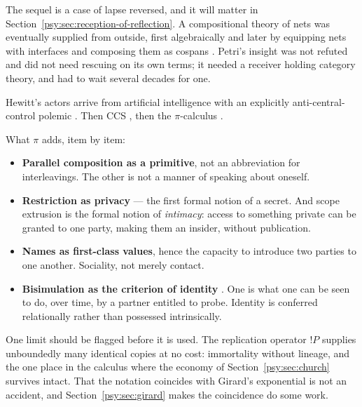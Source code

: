 The sequel is a case of lapse reversed, and it will matter in
Section~\ref{psy:sec:reception-of-reflection}.
A compositional theory of nets was eventually supplied from outside,
first algebraically \cite{meseguer1990} and later by equipping nets
with interfaces and composing them as cospans \cite{baez2020}.
Petri's insight was not refuted and did not need rescuing on its own
terms; it needed a receiver holding category theory, and had to wait
several decades for one.

Hewitt's actors arrive from artificial intelligence with an
explicitly anti-central-control polemic \cite{hewitt1973}.
Then CCS \cite{milner1980}, then the $\pi$-calculus
\cite{milner1992}.

What $\pi$ adds, item by item:

\begin{itemize}[leftmargin=1.4em,itemsep=0.15em]
\item \textbf{Parallel composition as a primitive}, not an
abbreviation for interleavings.
The other is not a manner of speaking about oneself.
\item \textbf{Restriction as privacy} --- the first formal notion of
a secret.
And scope extrusion is the formal notion of \emph{intimacy}: access
to something private can be granted to one party, making them an
insider, without publication.
\item \textbf{Names as first-class values}, hence the capacity to
introduce two parties to one another.
Sociality, not merely contact.
\item \textbf{Bisimulation as the criterion of identity}
\cite{park1981}.
One is what one can be seen to do, over time, by a partner entitled
to probe.
Identity is conferred relationally rather than possessed
intrinsically.
\end{itemize}

One limit should be flagged before it is used.
The replication operator $!P$ supplies unboundedly many identical
copies at no cost: immortality without lineage, and the one place in
the calculus where the economy of Section~\ref{psy:sec:church}
survives intact.
That the notation coincides with Girard's exponential is not an
accident, and Section~\ref{psy:sec:girard} makes the coincidence do
some work.

